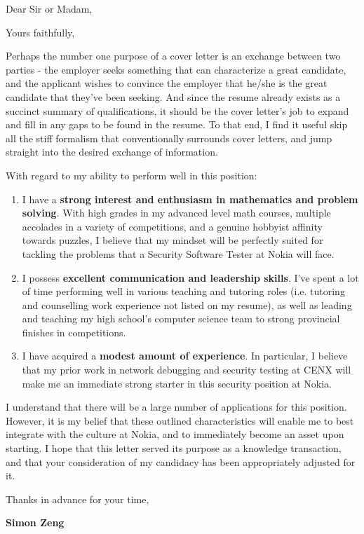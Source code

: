 \documentclass[12pt,a4paper,sans]{moderncv}        %
\begin{document}
\date{January 18, 2019}
\opening{Dear Sir or Madam,}
\closing{Yours faithfully,}
\makelettertitle

Perhaps the number one purpose of a cover letter is an exchange between two 
parties - the employer seeks something that can characterize a great candidate, 
and the applicant wishes to convince the employer that he/she is the great 
candidate that they've been seeking. And since the resume already exists as a 
succinct summary of qualifications, it should be the cover letter's job to 
expand and fill in any gaps to be found in the resume. To that end, I find it 
useful skip all the stiff formalism that conventionally surrounds cover letters, 
and jump straight into the desired exchange of information.

With regard to my ability to perform well in this position:
\smallskip
\begin{enumerate}
    \item I have a \textbf{strong interest and enthusiasm in mathematics and 
            problem solving}. With high grades in my advanced level math 
        courses, multiple accolades in a variety of competitions, and a genuine 
        hobbyist affinity towards puzzles, I believe that my mindset will be 
        perfectly suited for tackling the problems that a Security Software 
        Tester at Nokia will face.
        \smallskip
    \item I possess \textbf{excellent communication and leadership skills}. I've 
        spent a lot of time performing well in various teaching and tutoring 
        roles (i.e. tutoring and counselling work experience not listed on my 
        resume), as well as leading and teaching my high school's computer 
        science team to strong provincial finishes in competitions.
        \smallskip
    \item I have acquired a \textbf{modest amount of experience}. In particular, I 
        believe that my prior work in network debugging and security testing at 
        CENX will make me an immediate strong starter in this security position 
        at Nokia.
\end{enumerate}

I understand that there will be a large number of applications for this 
position. However, it is my belief that these outlined characteristics will 
enable me to best integrate with the culture at Nokia, and to immediately 
become an asset upon starting. I hope that this letter served its purpose as a 
knowledge transaction, and that your consideration of my candidacy has been 
appropriately adjusted for it.
\smallskip

Thanks in advance for your time,

\textbf{Simon Zeng}

\end{document}
